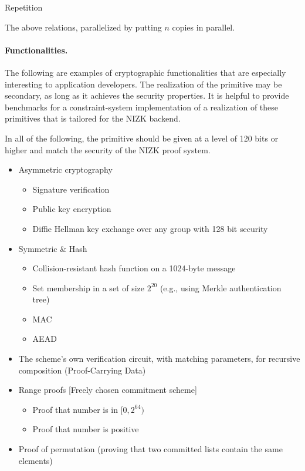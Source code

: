 Repetition

The above relations, parallelized by putting $n$ copies in parallel.



\paragraph{Functionalities.}

The following are examples of cryptographic functionalities that are especially interesting to application developers. The realization of the primitive may be secondary, as long as it achieves the security properties. It is helpful to provide benchmarks for a constraint-system implementation of a realization of these primitives that is tailored for the NIZK backend.

In all of the following, the primitive should be given at a level of 120 bits or higher and match the security of the NIZK proof system.
\begin{itemize}
    \item Asymmetric cryptography
				\begin{itemize}[label={- }]
        \item Signature verification
        \item Public key encryption
        \item Diffie Hellman key exchange over any group with 128 bit security
				\end{itemize}
    \item Symmetric \& Hash
				\begin{itemize}[label={- }]
        \item Collision-resistant hash function on a 1024-byte message
        \item Set membership in a set of size $2^{20}$ (e.g., using Merkle authentication tree)
        \item MAC
        \item AEAD
				\end{itemize}
    \item The scheme’s own verification circuit, with matching parameters, for recursive composition (Proof-Carrying Data)
    \item Range proofs [Freely chosen commitment scheme]
				\begin{itemize}[label={- }]
        \item Proof that number is in $[0, 2^{64})$ 
        \item Proof that number is positive
				\end{itemize}
    \item Proof of permutation (proving that two committed lists contain the same elements)
\end{itemize}



